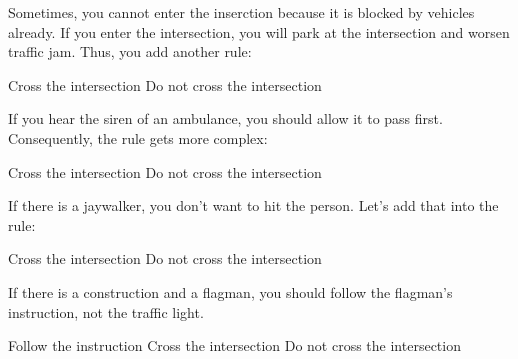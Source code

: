 Sometimes, you cannot enter the inserction because it is blocked
by vehicles already. If you enter the intersection, you will park
at the intersection and worsen traffic jam. Thus, you add another rule:

\begin{algorithm}[H]
    \begin{algorithmic}[1]
      \State Cross the intersection
      \Else
      \State Do not cross the intersection
      \EndIf
    \end{algorithmic}
\end{algorithm}

If you hear the siren of an ambulance, you should allow it to pass first.
Consequently, the rule gets more complex:

\begin{algorithm}[H]
    \begin{algorithmic}[1]
      \State Cross the intersection
      \Else
      \State Do not cross the intersection
      \EndIf
    \end{algorithmic}
\end{algorithm}

If there is a jaywalker, you don't want to hit the person. Let's add that into the rule:

\begin{algorithm}[H]
    \begin{algorithmic}[1]
      \State Cross the intersection
      \Else
      \State Do not cross the intersection
      \EndIf
    \end{algorithmic}
\end{algorithm}

If there is a construction and a flagman, you should follow the
flagman's instruction, not the traffic light.  

\begin{algorithm}[H]
    \begin{algorithmic}[1]
      \State Follow the instruction
      \Else
      \State Cross the intersection
      \Else
      \State Do not cross the intersection
      \EndIf
      \EndIf
    \end{algorithmic}
\end{algorithm}

